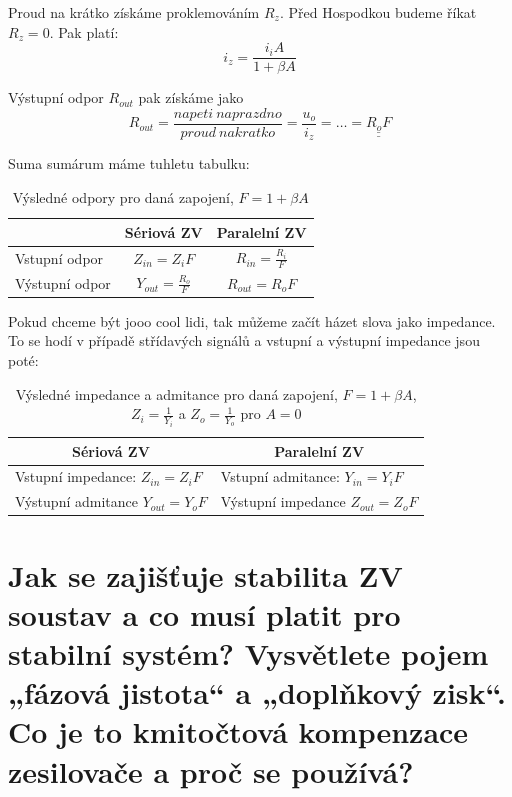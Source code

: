\documentclass[a4paper,12pt]{article}   %
\begin{document}
Proud na krátko získáme proklemováním $R_z$. Před Hospodkou budeme říkat $R_z = 0$. Pak platí:
\begin{equation*}
    i_z = \frac{i_i A}{1+\beta A}
\end{equation*}

Výstupní odpor $R_{out}$ pak získáme jako
\begin{equation}
    R_{out} = \frac{napeti~naprazdno}{proud~nakratko} = \frac{u_o}{i_z} = \dots = \underline{\underline{R_o F}}
\end{equation}

Suma sumárum máme tuhletu tabulku:
\begin{table}[h!]
    \centering
    \begin{tabular}{|l|c|c|}
        \hline
        & Sériová ZV & Paralelní ZV\\\hline\hline
        \rule{0pt}{2.5ex}Vstupní odpor & $Z_{in} = Z_i F$ & $R_{in} = \frac{R_i}{F}$\\[.7ex]\hline
        \rule{0pt}{2.5ex}Výstupní odpor & $Y_{out} = \frac{R_o}{F}$ & $R_{out} = R_o F$\\[.7ex]\hline
    \end{tabular}        
    \caption{Výsledné odpory pro daná zapojení, $F=1+\beta A$}
\end{table}%

Pokud chceme být jooo cool lidi, tak můžeme začít házet slova jako impedance. To se hodí v případě střídavých signálů a vstupní a výstupní impedance jsou poté:
\begin{table}[h!]
    \centering
    \begin{tabular}{|l|l|}
        \hline
        \multicolumn{1}{|c|}{Sériová ZV }& \multicolumn{1}{|c|}{Paralelní ZV}\\\hline\hline
        Vstupní impedance: $Z_{in} = Z_i F$ & Vstupní admitance: $Y_{in} = Y_i F$\\\hline
        Výstupní admitance $Y_{out} = Y_o F$ & Výstupní impedance $Z_{out} = Z_o F$\\\hline
    \end{tabular}
    \caption{Výsledné impedance a admitance pro daná zapojení, $F=1+\beta A$, $Z_i = \frac{1}{Y_i}$ a $Z_o = \frac{1}{Y_o}$ pro $A=0$}
\end{table}%










\section{Jak se zajišťuje stabilita ZV soustav a co musí platit pro stabilní systém? Vysvětlete pojem „fázová jistota“ a „doplňkový zisk“. Co je to kmitočtová kompenzace zesilovače a proč se používá?}
\end{document}
